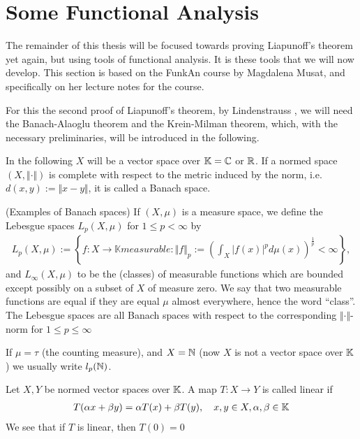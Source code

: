 \documentclass[../../main.tex]{subfiles}
\begin{document}
\section{Some Functional Analysis}

The remainder of this thesis will be focused towards proving Liapunoff's theorem yet again, but using tools of functional analysis. It is these tools that we will now develop. This section is based on the FunkAn course by Magdalena Musat, and specifically on her lecture notes \cite{Musat17} for the course.

For this the second proof of Liapunoff's theorem, by Lindenstrauss \cite{Lindenstrauss66}, we will need the Banach-Alaoglu theorem and the Krein-Milman theorem, which, with the necessary preliminaries, will be introduced in the following.

In the following $X$ will be a vector space over $\mathbb{K}=\mathbb{C}$ or $\mathbb{R}$. If a normed space $(X, \Vert \cdot \Vert)$ is complete with respect to the metric induced by the norm, i.e. $d(x,y):=\Vert x - y \Vert$, it is called a Banach space.

\begin{example}(Examples of Banach spaces)
If $(X, \mu)$ is a measure space, we define the Lebesgue spaces $L_{p}(X, \mu)$ for $1\le p < \infty$ by
\begin{align*}
	L_{p}(X, \mu) := \left\{ f: X \to \mathbb{K} measurable : \Vert f \Vert_{p}:= \left( \int_{X}|f(x)|^{p}d\mu(x) \right)^{\frac{1}{p}} < \infty \right\},
\end{align*}
and $L_{\infty}(X, \mu)$ to be the (classes) of measurable functions which are bounded except possibly on a subset of $X$ of measure zero.
We say that two measurable functions are equal if they are equal $\mu$ almost everywhere, hence the word ``class''.
The Lebesgue spaces are all Banach spaces with respect to the corresponding $\Vert\cdot\Vert$-norm for $1\le p \le \infty$
\end{example}

If $\mu=\tau$ (the counting measure), and $X=\mathbb{N}$ (now $X$ is not a vector space over $\mathbb{K}$) we usually write $l_{p}(\mathbb{N})$.


\begin{definition}
Let $X,Y$ be normed vector spaces over $\mathbb{K}$. A map $T:X\to Y$ is called linear if
\begin{align*}
	T(\alpha x + \beta y) = \alpha T(x) + \beta T(y), \quad x,y\in X, \alpha,\beta \in \mathbb{K}
\end{align*}
We see that if $T$ is linear, then $T(0)=0$
\end{definition}
\end{document}
